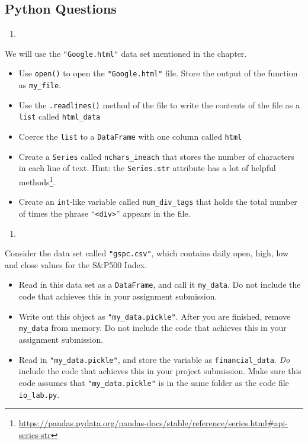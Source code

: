 \documentclass[12pt,krantz2]{krantz}
\providecommand{\tightlist}{%
  \setlength{\itemsep}{0pt}\setlength{\parskip}{0pt}}
\renewcommand{\href}[2]{#2\footnote{\url{#1}}}
\begin{document}
\hypertarget{python-questions-7}{%
\subsection{Python Questions}\label{python-questions-7}}

\begin{enumerate}
\def\labelenumi{\arabic{enumi}.}
\item
\end{enumerate}

We will use the \texttt{"Google.html"} data set mentioned in the chapter.

\begin{itemize}
\tightlist
\item
  Use \texttt{open()} to open the \texttt{"Google.html"} file. Store the output of the function as \texttt{my\_file}.
\item
  Use the \texttt{.readlines()} method of the file to write the contents of the file as a \texttt{list} called \texttt{html\_data}
\item
  Coerce the \texttt{list} to a \texttt{DataFrame} with one column called \texttt{html}
\item
  Create a \texttt{Series} called \texttt{nchars\_ineach} that stores the number of characters in each line of text. Hint: the \href{https://pandas.pydata.org/pandas-docs/stable/reference/series.html\#api-series-str}{\texttt{Series.str} attribute has a lot of helpful methods}.
\item
  Create an \texttt{int}-like variable called \texttt{num\_div\_tags} that holds the total number of times the phrase ``\texttt{\textless{}div\textgreater{}}'' appears in the file.
\end{itemize}

\begin{enumerate}
\def\labelenumi{\arabic{enumi}.}
\setcounter{enumi}{1}
\item
\end{enumerate}

Consider the data set called \texttt{"gspc.csv"}, which contains daily open, high, low and close values for the S\&P500 Index.

\begin{itemize}
\tightlist
\item
  Read in this data set as a \texttt{DataFrame}, and call it \texttt{my\_data}. Do not include the code that achieves this in your assignment submission.
\item
  Write out this object as \texttt{"my\_data.pickle"}. After you are finished, remove \texttt{my\_data} from memory. Do not include the code that achieves this in your assignment submission.
\item
  Read in \texttt{"my\_data.pickle"}, and store the variable as \texttt{financial\_data}. \emph{Do} include the code that achieves this in your project submission. Make sure this code assumes that \texttt{"my\_data.pickle"} is in the same folder as the code file \texttt{io\_lab.py}.
\end{itemize}
\end{document}
